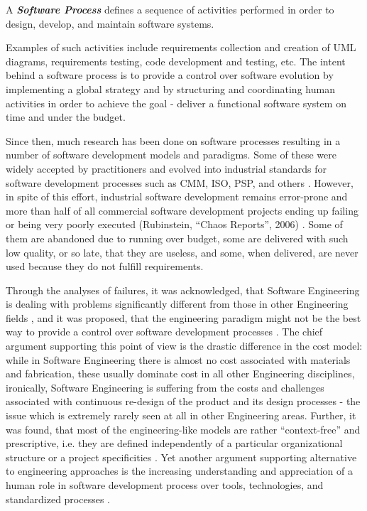 \begin{defn}\label{def_process}
A \textbf{\textit{Software Process}} defines a sequence of activities performed in order 
to design, develop, and maintain software systems.
\end{defn}
Examples of such activities include requirements collection and creation of UML diagrams, 
requirements testing, code development and testing, etc. The intent behind a software process is 
to provide a control over software evolution by implementing a global strategy and by structuring
and coordinating human activities in order to achieve the goal - deliver a functional software system 
on time and under the budget. 

Since then, much research has been done on software processes resulting in a number
of software development models and paradigms. Some of these were widely accepted by practitioners 
and evolved into industrial standards for software development processes such as CMM, ISO, PSP, 
and others \cite{citeulike:5043104}. However, in spite of this effort, industrial software 
development remains error-prone and more than half of all 
commercial software development projects ending up failing or being very poorly executed 
(Rubinstein, ``Chaos Reports'', 2006) \cite{chaos2006}. Some of them are abandoned due to running 
over budget, some are delivered with such low quality, or so late, that they are useless, and some, 
when delivered, are never used because they do not fulfill requirements. 

Through the analyses of failures, it was acknowledged, that Software Engineering 
is dealing with problems significantly different from those in other Engineering fields 
\cite{citeulike:2207657}, and it was proposed, that the engineering paradigm might 
not be the best way to provide a control over software development processes 
\cite{citeulike:3729379} \cite{citeulike:5203446}.
The chief argument supporting this point of view is the drastic difference in the cost model:
while in Software Engineering there is almost no cost associated with materials and 
fabrication, these usually dominate cost in all other Engineering disciplines, 
ironically, Software Engineering is suffering from the costs and challenges associated with 
continuous re-design of the product and its design processes - the issue which is 
extremely rarely seen at all in other Engineering areas. 
Further, it was found, that most of the engineering-like models are rather ``context-free''
and prescriptive, i.e. they are defined independently of a particular organizational 
structure or a project specificities \cite{sacchi_2001}.
Yet another argument supporting alternative to engineering approaches is the increasing 
understanding and appreciation of a human role in software development process over tools, 
technologies, and standardized processes \cite{citeulike:6580825} \cite{citeulike:149387}
\cite{1605185} \cite{citeulike:113403} \cite{1605188} \cite{citeulike:12743107}. 

